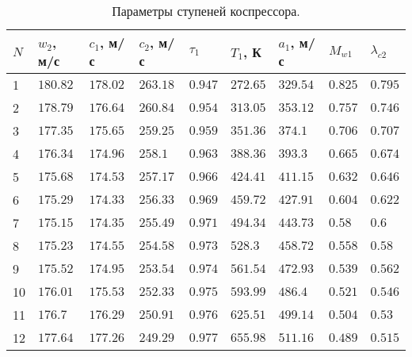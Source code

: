 \documentclass[a4paper,10pt]{article}
\begin{document}
    \begin{longtable}{|p{0.6cm}|p{1.1cm}|p{1.1cm}|p{1.1cm}|p{1.1cm}|p{1.1cm}| p{1.1cm}|p{1.1cm}|p{1.1cm}|}
        \caption{Параметры ступеней коспрессора.}\\ \hline
        $N$ & $w_2$, м/с & $c_1$, м/с & $c_2$, м/с & $\tau_1$ & $T_1$, К & $a_1$, м/с & $M_{w1}$ & $\lambda_{c2}$ \\ \hline
%        
        1 & $180.82$ &
        $178.02$ & $263.18$ & $0.947$ &
        $272.65$ & $329.54$ & $0.825$ &
        $0.795$\\ \hline
%        
        2 & $178.79$ &
        $176.64$ & $260.84$ & $0.954$ &
        $313.05$ & $353.12$ & $0.757$ &
        $0.746$\\ \hline
%        
        3 & $177.35$ &
        $175.65$ & $259.25$ & $0.959$ &
        $351.36$ & $374.1$ & $0.706$ &
        $0.707$\\ \hline
%        
        4 & $176.34$ &
        $174.96$ & $258.1$ & $0.963$ &
        $388.36$ & $393.3$ & $0.665$ &
        $0.674$\\ \hline
%        
        5 & $175.68$ &
        $174.53$ & $257.17$ & $0.966$ &
        $424.41$ & $411.15$ & $0.632$ &
        $0.646$\\ \hline
%        
        6 & $175.29$ &
        $174.33$ & $256.33$ & $0.969$ &
        $459.72$ & $427.91$ & $0.604$ &
        $0.622$\\ \hline
%        
        7 & $175.15$ &
        $174.35$ & $255.49$ & $0.971$ &
        $494.34$ & $443.73$ & $0.58$ &
        $0.6$\\ \hline
%        
        8 & $175.23$ &
        $174.55$ & $254.58$ & $0.973$ &
        $528.3$ & $458.72$ & $0.558$ &
        $0.58$\\ \hline
%        
        9 & $175.52$ &
        $174.95$ & $253.54$ & $0.974$ &
        $561.54$ & $472.93$ & $0.539$ &
        $0.562$\\ \hline
%        
        10 & $176.01$ &
        $175.53$ & $252.33$ & $0.975$ &
        $593.99$ & $486.4$ & $0.521$ &
        $0.546$\\ \hline
%        
        11 & $176.7$ &
        $176.29$ & $250.91$ & $0.976$ &
        $625.51$ & $499.14$ & $0.504$ &
        $0.53$\\ \hline
%        
        12 & $177.64$ &
        $177.26$ & $249.29$ & $0.977$ &
        $655.98$ & $511.16$ & $0.489$ &
        $0.515$\\ \hline
%        
    \end{longtable}

    
\end{document}
